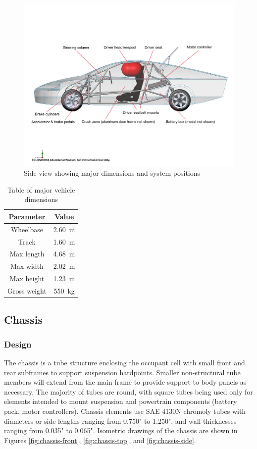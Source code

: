 \documentclass[10pt]{article}
\begin{document}
\begin{figure}
\centering
\includegraphics[width=\textwidth]{figures/msxii-side-view-annotated}
\caption{Side view showing major dimensions and system positions}
\label{fig:msxii-side-view-annotated}
\end{figure}

\begin{table}
\centering
\begin{tabular}{cc}
\toprule
Parameter & Value \\
\midrule
Wheelbase    & \SI{2.60}{\metre}    \\
Track        & \SI{1.60}{\metre}    \\
Max length   & \SI{4.68}{\metre}    \\
Max width    & \SI{2.02}{\metre}    \\
Max height   & \SI{1.23}{\metre}    \\
Gross weight & \SI{550}{\kilo\gram} \\
\bottomrule
\end{tabular}
\caption{Table of major vehicle dimensions}
\label{tab:msxii-dimensions}
\end{table}

\subsection{Chassis}
\subsubsection{Design}
The chassis is a tube structure enclosing the occupant cell with small front and rear subframes to support suspension hardpoints. Smaller non-structural tube members will extend from the main frame to provide support to body panels as necessary. The majority of tubes are round, with square tubes being used only for elements intended to mount suspension and powertrain components (battery pack, motor controllers). Chassis elements use SAE 4130N chromoly tubes with diameters or side lengths ranging from 0.750" to 1.250", and wall thicknesses ranging from 0.035" to 0.065". Isometric drawings of the chassis are shown in Figures \ref{fig:chassis-front}, \ref{fig:chassis-top}, and \ref{fig:chassis-side}.
\end{document}
